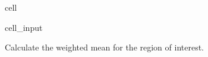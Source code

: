 \documentclass[letterpaper,10pt,english]{jupyterBook}
\begin{document}
\begin{sphinxuseclass}{cell}\begin{sphinxVerbatimInput}

\begin{sphinxuseclass}{cell_input}
\begin{sphinxVerbatim}[commandchars=\\\{\}]
    
    
\end{sphinxVerbatim}

\end{sphinxuseclass}\end{sphinxVerbatimInput}

\end{sphinxuseclass}
\sphinxAtStartPar
Calculate the weighted mean for the region of interest.
\end{document}
